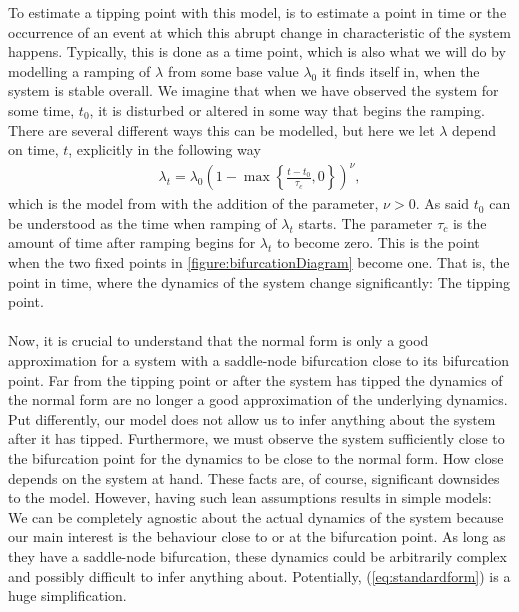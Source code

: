 To estimate a tipping point with this model, is to estimate a point in time or the occurrence of an event at which this abrupt change in characteristic of the system happens. Typically, this is done as a time point, which is also what we will do by modelling a ramping of $\lambda$ from some base value $\lambda_0$ it finds itself in, when the system is stable overall. We imagine that when we have observed the system for some time, $t_0$, it is disturbed or altered in some way that begins the ramping. There are several different ways this can be modelled, but here we let $\lambda$ depend on time, $t$, explicitly in the following way
\begin{align}
    \lambda_t = \lambda_0\left(1 - \max\left\{\frac{t - t_0}{\tau_c},0\right\}\right)^\nu, \label{eq:lambdaRampDefinition}
\end{align} 
which is the model from \cite[equation (2)]{Ditlevsen2023} with the addition of the parameter, $\nu>0$. As said $t_0$ can be understood as the time when ramping of $\lambda_t$ starts. The parameter $\tau_c$ is the amount of time after ramping begins for $\lambda_t$ to become zero. This is the point when the two fixed points in \ref{figure:bifurcationDiagram} become one. That is, the point in time, where the dynamics of the system change significantly: The tipping point. \\\\
Now, it is crucial to understand that the normal form is only a good approximation for a system with a saddle-node bifurcation close to its bifurcation point. Far from the tipping point or after the system has tipped the dynamics of the normal form are no longer a good approximation of the underlying dynamics. Put differently, our model does not allow us to infer anything about the system after it has tipped. Furthermore, we must observe the system sufficiently close to the bifurcation point for the dynamics to be close to the normal form. How close depends on the system at hand. These facts are, of course, significant downsides to the model. However, having such lean assumptions results in simple models: We can be completely agnostic about the actual dynamics of the system because our main interest is the behaviour close to or at the bifurcation point. As long as they have a saddle-node bifurcation, these dynamics could be arbitrarily complex and possibly difficult to infer anything about. Potentially, (\ref{eq:standardform}) is a huge simplification.
